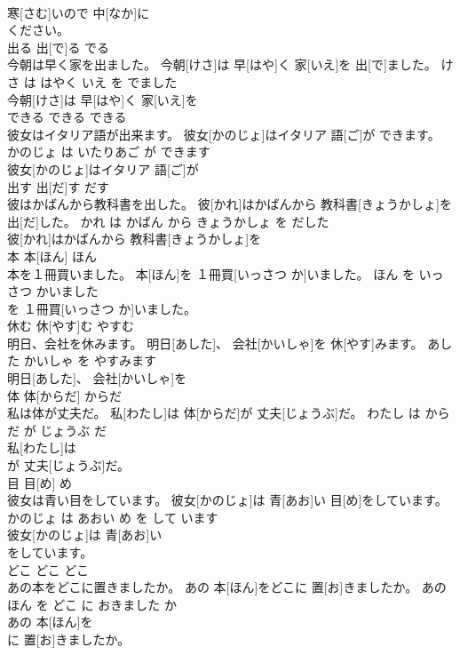 \documentclass[8pt]{extreport}
\begin{document}
\begin{CJK}{UTF8}{min}
\\	寒[さむ]いので 中[なか]に
\\	ください。		
\\	出る	出[で]る	でる	
\\	今朝は早く家を出ました。	今朝[けさ]は 早[はや]く 家[いえ]を 出[で]ました。	けさ は はやく いえ を でました	
\\	今朝[けさ]は 早[はや]く 家[いえ]を
\\	できる	できる	できる	
\\	彼女はイタリア語が出来ます。	彼女[かのじょ]はイタリア 語[ご]が できます。	かのじょ は いたりあご が できます	
\\	彼女[かのじょ]はイタリア 語[ご]が
\\	出す	出[だ]す	だす	
\\	彼はかばんから教科書を出した。	彼[かれ]はかばんから 教科書[きょうかしょ]を 出[だ]した。	かれ は かばん から きょうかしょ を だした	
\\	彼[かれ]はかばんから 教科書[きょうかしょ]を
\\	本	本[ほん]	ほん	
\\	本を１冊買いました。	本[ほん]を １冊買[いっさつ か]いました。	ほん を いっさつ かいました	
\\	を １冊買[いっさつ か]いました。		
\\	休む	休[やす]む	やすむ	
\\	明日、会社を休みます。	明日[あした]、 会社[かいしゃ]を 休[やす]みます。	あした かいしゃ を やすみます	
\\	明日[あした]、 会社[かいしゃ]を
\\	体	体[からだ]	からだ	
\\	私は体が丈夫だ。	私[わたし]は 体[からだ]が 丈夫[じょうぶ]だ。	わたし は からだ が じょうぶ だ	
\\	私[わたし]は
\\	が 丈夫[じょうぶ]だ。		
\\	目	目[め]	め	
\\	彼女は青い目をしています。	彼女[かのじょ]は 青[あお]い 目[め]をしています。	かのじょ は あおい め を して います	
\\	彼女[かのじょ]は 青[あお]い
\\	をしています。		
\\	どこ	どこ	どこ	
\\	あの本をどこに置きましたか。	あの 本[ほん]をどこに 置[お]きましたか。	あの ほん を どこ に おきました か	
\\	あの 本[ほん]を
\\	に 置[お]きましたか。		

\end{CJK}
\end{document}
